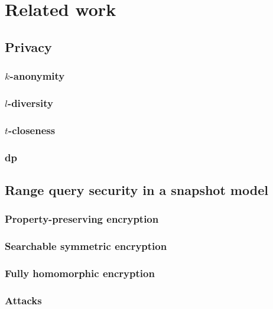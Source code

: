 \chapter{Related work}
\thispagestyle{myheadings}

	\section{Privacy}

		\subsection{$k$-anonymity}

		\subsection{$l$-diversity}

		\subsection{$t$-closeness}

		\subsection{\texorpdfstring{\acrlong{dp}}{Differential Privacy}}

	\section{Range query security in a snapshot model}

		\subsection{Property-preserving encryption}

		\subsection{Searchable symmetric encryption}

		\subsection{Fully homomorphic encryption}

		\subsection{Attacks}

